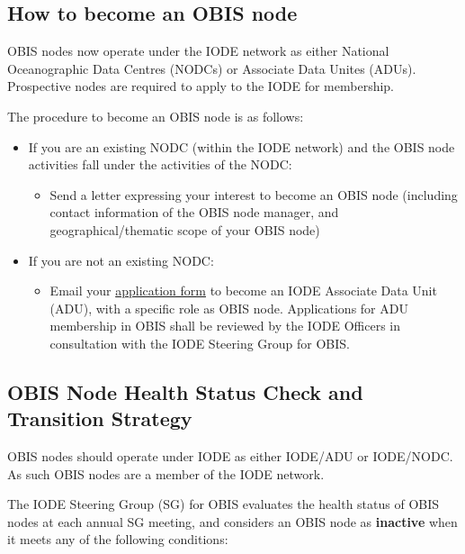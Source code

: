 \documentclass[
  letterpaper,
  DIV=11,
  numbers=noendperiod,
  oneside]{scrreprt}
\providecommand{\tightlist}{%
  \setlength{\itemsep}{0pt}\setlength{\parskip}{0pt}}\usepackage{longtable,booktabs,array}
\begin{document}
\hypertarget{how-to-become-an-obis-node}{%
\subsection{How to become an OBIS
node}\label{how-to-become-an-obis-node}}

OBIS nodes now operate under the IODE network as either National
Oceanographic Data Centres (NODCs) or Associate Data Unites (ADUs).
Prospective nodes are required to apply to the IODE for membership.

The procedure to become an OBIS node is as follows:

\begin{itemize}
\tightlist
\item
  If you are an existing NODC (within the IODE network) and the OBIS
  node activities fall under the activities of the NODC:

  \begin{itemize}
  \tightlist
  \item
    Send a letter expressing your interest to become an OBIS node
    (including contact information of the OBIS node manager, and
    geographical/thematic scope of your OBIS node)
  \end{itemize}
\item
  If you are not an existing NODC:

  \begin{itemize}
  \tightlist
  \item
    Email your
    \href{http://iode.org/index.php?option=com_oe\&task=viewDocumentRecord\&docID=11793}{application
    form} to become an IODE Associate Data Unit (ADU), with a specific
    role as OBIS node. Applications for ADU membership in OBIS shall be
    reviewed by the IODE Officers in consultation with the IODE Steering
    Group for OBIS.
  \end{itemize}
\end{itemize}

\hypertarget{obis-node-health-status-check-and-transition-strategy}{%
\subsection{OBIS Node Health Status Check and Transition
Strategy}\label{obis-node-health-status-check-and-transition-strategy}}

OBIS nodes should operate under IODE as either IODE/ADU or IODE/NODC. As
such OBIS nodes are a member of the IODE network.

The IODE Steering Group (SG) for OBIS evaluates the health status of
OBIS nodes at each annual SG meeting, and considers an OBIS node as
\textbf{inactive} when it meets any of the following conditions:
\end{document}
